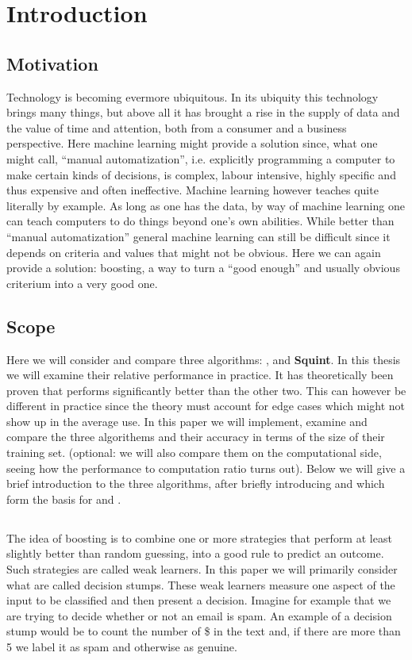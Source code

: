 
\chapter{Introduction}
\label{chap:intro}
\section{Motivation}
\label{sec:motiv}

Technology is becoming evermore ubiquitous. In its ubiquity this technology brings many things, but above all it has brought a rise in the supply of data and the value of time and attention, both from a consumer and a business perspective. Here machine learning might provide a solution since, what one might call, ``manual automatization'', i.e. explicitly programming a computer to make certain kinds of decisions, is complex, labour intensive, highly specific and thus expensive and often ineffective. Machine learning however teaches quite literally by example. As long as one has the data, by way of machine learning one can teach computers to do things beyond one's own abilities. While better than ``manual automatization'' general machine learning can still be difficult since it depends on criteria and values that might not be obvious. Here we can again provide a solution: boosting, a way to turn a ``good enough'' and usually obvious criterium into a very good one.

\section{Scope} Here we will consider and compare three algorithms: \adaB, \adaN and \textbf{Squint}. In this thesis we will examine their relative performance in practice. It has theoretically been proven that \squint performs significantly better than the other two. This can however be different in practice since the theory must account for edge cases which might not show up in the average use. In this paper we will implement, examine and compare the three algorithems and their accuracy in terms of the size of their training set. {\color{red}(optional: we will also compare them on the computational side, seeing how the performance to computation ratio turns out).} Below we will give a brief introduction to the three algorithms, after briefly introducing \hedge and \weak which form the basis for \adaB and \adaN.

\section{\weak}
The idea of boosting is to combine one or more strategies that perform at least slightly better than random guessing, into a good rule to predict an outcome. Such strategies are called weak learners. In this paper we will primarily consider what are called decision stumps. These weak learners measure one aspect of the input to be classified and then present a decision. Imagine for example that we are trying to decide whether or not an email is spam. An example of a decision stump would be to count the number of \$ in the text and, if there are more than 5 we label it as spam and otherwise as genuine. 

